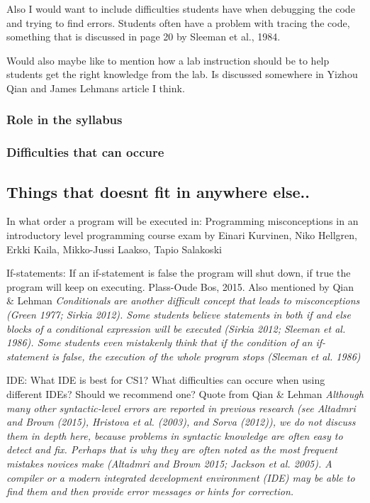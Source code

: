 \documentclass[twocolumn]{article}
\begin{document}
Also I would want to include difficulties students have when debugging the code and trying to find errors. Students often have a problem with tracing the code, something that is discussed in page 20 by Sleeman et al., 1984. 

Would also maybe like to mention how a lab instruction should be to help students get the right knowledge from the lab. Is discussed somewhere in Yizhou Qian and James Lehmans article I think.
\subsubsection{Role in the syllabus}

\subsubsection{Difficulties that can occure}

\subsection{Things that doesnt fit in anywhere else..}

In what order a program will be executed in: Programming misconceptions in an introductory level programming course exam by Einari Kurvinen, Niko Hellgren, Erkki Kaila, Mikko-Jussi Laakso, Tapio Salakoski

If-statements: If an if-statement is false the program will shut down, if true the program will keep on executing. Plass-Oude Bos, 2015. Also mentioned by Qian \& Lehman \emph{Conditionals are another difficult concept that leads to misconceptions (Green 1977; Sirkia 2012). Some students believe statements in both if and else blocks of a conditional expression will be executed (Sirkia 2012; Sleeman et al. 1986). Some students even mistakenly think that if the condition of an if-statement is false, the execution of the whole program stops (Sleeman et al. 1986)}

IDE: What IDE is best for CS1? What difficulties can occure when using different IDEs? Should we recommend one? Quote from Qian \& Lehman \emph{Although many other syntactic-level errors are reported in previous research (see Altadmri and Brown (2015), Hristova et al. (2003), and Sorva (2012)), we do not discuss them in depth here, because problems in syntactic knowledge are often easy to detect and fix. Perhaps that is why they are often noted as the most frequent mistakes novices make (Altadmri and Brown 2015; Jackson et al. 2005). A compiler or a modern integrated development environment (IDE) may be able to find them and then provide error messages or hints for correction.}
\end{document}
